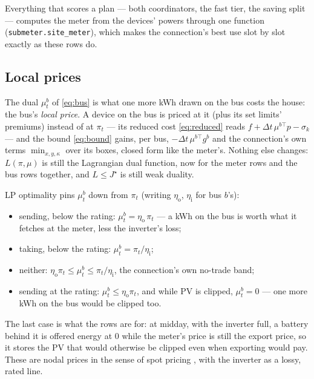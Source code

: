 \documentclass[11pt,a4paper]{article}
\newcommand{\dt}{\Delta t}
\begin{document}
Everything that scores a plan
--- both coordinators, the fast tier, the saving split --- computes the meter
from the devices' powers through one function (\texttt{submeter.site\_meter}),
which makes the connection's best use slot by slot exactly as these rows do.

\subsection{Local prices}

The dual $\mu^b_t$ of \eqref{eq:bus} is what one more kWh drawn on the bus costs
the house: the bus's \emph{local price}. A device on the bus is priced at it (plus
its set limits' premiums) instead of at $\pi_t$ --- its reduced cost \eqref{eq:reduced} reads
$f + \dt\,\mu^{b\top} p - \sigma_k$ --- and the bound \eqref{eq:bound} gains,
per bus, $-\dt\,\mu^{b\top} g^b$ and the connection's own terms
$\min_{x,y,\kappa}$ over its boxes, closed form like the meter's. Nothing else
changes: $L(\pi, \mu)$ is still the Lagrangian dual function, now for the meter
rows and the bus rows together, and $L \le J^\star$ is still weak duality.

LP optimality pins $\mu^b_t$ down from $\pi_t$ (writing $\eta_{\mathrm o}$,
$\eta_{\mathrm i}$ for bus $b$'s):
\begin{itemize}[leftmargin=*,itemsep=1pt]
\item sending, below the rating: $\mu^b_t = \eta_{\mathrm o}\,\pi_t$ --- a kWh on
  the bus is worth what it fetches at the meter, less the inverter's loss;
\item taking, below the rating: $\mu^b_t = \pi_t/\eta_{\mathrm i}$;
\item neither: $\eta_{\mathrm o}\pi_t \le \mu^b_t \le \pi_t/\eta_{\mathrm i}$, the
  connection's own no-trade band;
\item sending at the rating: $\mu^b_t \le \eta_{\mathrm o}\pi_t$, and while PV is
  clipped, $\mu^b_t = 0$ --- one more kWh on the bus would be clipped too.
\end{itemize}
The last case is what the rows are for: at midday, with the inverter full, a
battery behind it is offered energy at $0$ while the meter's price is still the
export price, so it stores the PV that would otherwise be clipped even when
exporting would pay. These are nodal prices in the sense of spot pricing
\cite{schweppe1988}, with the inverter as a lossy, rated line.
\end{document}
